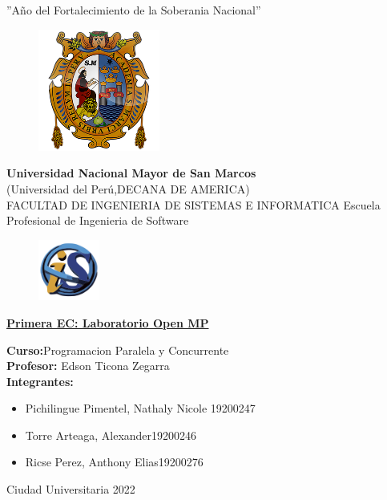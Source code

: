 \documentclass[12pt, letterpaper]{article}
\begin{document}
\begin{center}
    ''Año del Fortalecimiento de la Soberania Nacional''
    \vspace{5mm}
    \begin{figure}[h]
        \centering
        \includegraphics[width=4cm,height=4cm]{UNMSM}
    \end{figure}

    \textbf{Universidad Nacional Mayor de San Marcos} \\
    (Universidad del Perú,DECANA DE AMERICA)\\
    \vspace{5mm}
    FACULTAD DE INGENIERIA DE SISTEMAS E INFORMATICA
    Escuela Profesional de Ingenieria de Software
    \begin{figure}[h]
        \centering   
        \includegraphics[width=2cm,height=2cm]{FISI}   
    \end{figure}

\textbf{\underline{Primera EC: Laboratorio Open MP}}

    \begin{flushleft}
    \textbf{Curso:}Programacion Paralela y Concurrente\\
    \vspace{2mm}
    \textbf{Profesor:} Edson Ticona Zegarra\\
    \vspace{2mm}
    \textbf{Integrantes:} 
    \begin{itemize}
        \item Pichilingue Pimentel, Nathaly Nicole\hspace{1cm} 19200247
        \item Torre Arteaga, Alexander\hspace{3.2cm}19200246
        \item Ricse Perez, Anthony Elias\hspace{3cm}19200276
    \end{itemize}
    \end{flushleft}

    Ciudad Universitaria 2022
 
\end{center}
\end{document}
